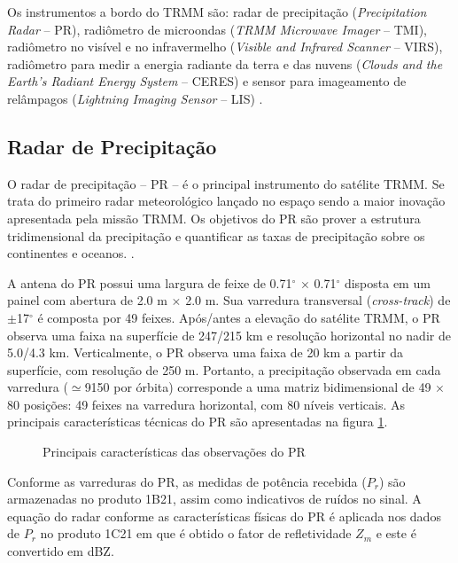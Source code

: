 Os instrumentos a bordo do TRMM são: radar de precipitação (\textit{Precipitation Radar} -- PR), radiômetro de microondas (\textit{TRMM Microwave Imager} -- TMI), radiômetro no visível e no infravermelho (\textit{Visible and Infrared Scanner} -- VIRS), radiômetro para medir a energia radiante da terra e das nuvens (\textit{Clouds and the Earth's Radiant Energy System} -- CERES) e sensor para imageamento de relâmpagos (\textit{Lightning Imaging Sensor} -- LIS) \cite{kummerok1998}.

\subsection{Radar de Precipitação}

O radar de precipitação -- PR -- é o principal instrumento do satélite TRMM. Se trata do primeiro radar meteorológico lançado no espaço sendo a maior inovação apresentada pela missão TRMM. Os objetivos do PR são prover a estrutura tridimensional da precipitação e quantificar as taxas de precipitação sobre os continentes e oceanos.  \cite{kummerok1998}. 



A antena do PR possui uma largura de feixe de 0.71$^{\circ}$ $\times$ 0.71$^{\circ}$ disposta em um painel com abertura de 2.0 m $\times$ 2.0 m. Sua varredura transversal (\textit{cross-track}) de $\pm$17$^{\circ}$ é composta por 49 feixes. Após/antes a elevação do satélite TRMM, o PR observa uma faixa na superfície de 247/215 km e resolução horizontal no nadir de 5.0/4.3 km. Verticalmente, o PR observa uma faixa de 20 km a partir da superfície, com resolução de 250 m. Portanto, a precipitação observada em cada varredura ($\simeq$9150 por órbita) corresponde a uma matriz bidimensional de 49 $\times$ 80 posições: 49 feixes na varredura horizontal, com 80 níveis verticais. As principais características técnicas do PR são apresentadas na figura \ref{prtrmm}.

\begin{figure}[!hb]
\caption{Principais características das observações do PR \cite{trmmhandbook}}
\label{prtrmm} 
\end{figure} 

Conforme as varreduras do PR, as medidas de  potência recebida ($P_r$) são armazenadas no produto 1B21, assim como indicativos de ruídos no sinal. A equação do radar conforme as características físicas do PR é aplicada nos dados de $P_r$ no produto 1C21 em que é obtido o fator de refletividade $Z_m$ e este é convertido em dBZ. 

